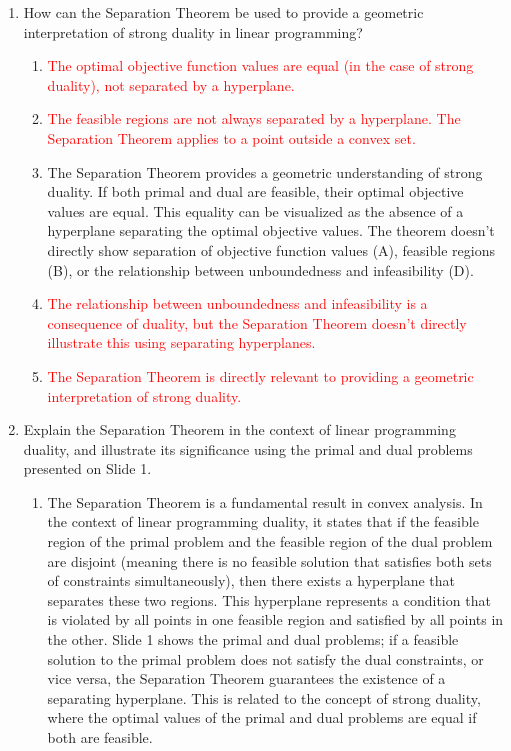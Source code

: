 \documentclass{article}%
\newcommand{\incorrect}[1]{\textcolor{red}{#1}}
\begin{document}
\begin{enumerate}
\begin{enumerate}
\item \incorrect{Primal infeasibility implies dual unboundedness, not dual infeasibility. The Separation Theorem doesn't directly link the absence of a separating hyperplane to dual unboundedness.}%
\end{enumerate}%
\vspace{1em}%
\item How can the Separation Theorem be used to provide a geometric interpretation of strong duality in linear programming?%
\begin{enumerate}%
\item \incorrect{The optimal objective function values are equal (in the case of strong duality), not separated by a hyperplane.}%
\item \incorrect{The feasible regions are not always separated by a hyperplane. The Separation Theorem applies to a point outside a convex set.}%
\item The Separation Theorem provides a geometric understanding of strong duality.  If both primal and dual are feasible, their optimal objective values are equal.  This equality can be visualized as the absence of a hyperplane separating the optimal objective values.  The theorem doesn't directly show separation of objective function values (A), feasible regions (B), or the relationship between unboundedness and infeasibility (D).%
\item \incorrect{The relationship between unboundedness and infeasibility is a consequence of duality, but the Separation Theorem doesn't directly illustrate this using separating hyperplanes.}%
\item \incorrect{The Separation Theorem is directly relevant to providing a geometric interpretation of strong duality.}%
\end{enumerate}%
\vspace{1em}%
\item Explain the Separation Theorem in the context of linear programming duality, and illustrate its significance using the primal and dual problems presented on Slide 1.%
\begin{enumerate}%
\item The Separation Theorem is a fundamental result in convex analysis.  In the context of linear programming duality, it states that if the feasible region of the primal problem and the feasible region of the dual problem are disjoint (meaning there is no feasible solution that satisfies both sets of constraints simultaneously), then there exists a hyperplane that separates these two regions. This hyperplane represents a condition that is violated by all points in one feasible region and satisfied by all points in the other.  Slide 1 shows the primal and dual problems; if a feasible solution to the primal problem does not satisfy the dual constraints, or vice versa, the Separation Theorem guarantees the existence of a separating hyperplane. This is related to the concept of strong duality, where the optimal values of the primal and dual problems are equal if both are feasible.%

\end{enumerate}
\end{enumerate}
\end{document}
